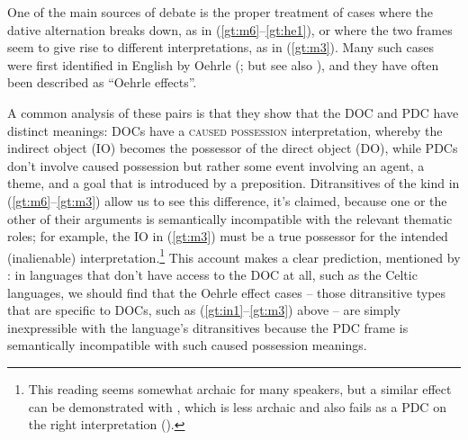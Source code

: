 \documentclass[output=paper,colorlinks,citecolor=brown]{langscibook}
\begin{document}
One of the main sources of debate is the proper treatment of cases where the dative alternation breaks down, as in (\ref{gt:m6}--\ref{gt:he1}), or where the two frames seem to give rise to different interpretations, as in (\ref{gt:m3}). Many such cases were first identified in English by Oehrle (\citeyear{gt:Oehrle:1976}; but see also \citealt{gt:Green:1974}), and they have often been described as ``Oehrle effects''.





\noindent A common analysis of these pairs is that they show that the DOC and PDC have distinct meanings: DOCs have a \textsc{caused possession} interpretation, whereby the indirect object (IO) becomes the possessor of the direct object (DO), while PDCs don't involve caused possession but rather some event involving an agent, a theme, and a goal that is introduced by a preposition. Ditransitives of the kind in (\ref{gt:m6}--\ref{gt:m3}) allow us to see this difference, it's claimed, because one or the other of their arguments is semantically incompatible with the relevant thematic roles; for example, the IO in (\ref{gt:m3}) must be a true possessor for the intended (inalienable) interpretation.\footnote{\label{gt:fnn}This reading seems somewhat archaic for many speakers, but a similar effect can be demonstrated with , which is less archaic and also fails as a PDC on the right interpretation ().} This account makes a clear prediction, mentioned by \citet[66, fn. 12]{gt:Harley:2002a}: in languages that don't have access to the DOC at all, such as the Celtic languages, we should find that the Oehrle effect cases -- those ditransitive types that are specific to DOCs, such as (\ref{gt:in1}--\ref{gt:m3}) above -- are simply inexpressible with the language's ditransitives because the PDC frame is semantically incompatible with such caused possession meanings. 
\end{document}
